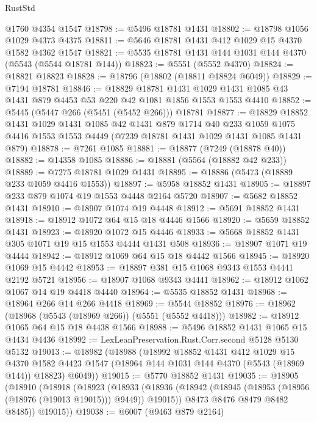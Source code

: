 \begin{lexlean}{RustStd}
\begin{coremodule}
    @1760
    @4354
    @1547
@18798 := @5496 @18781 @1431
@18802 := @18798 @1056 @1029 @4373 @4375
@18811 := @5646 @18781 @1431 @412 @1029 @15 @4370 @1582 @4362 @1547
@18821 := @5535 @18781 @1431 @144 @1031 @144 @4370 (@5543 (@5544 @18781 @144))
@18823 := @5551 (@5552 @4370)
@18824 := @18821 @18823
@18828 := @18796 (@18802 (@18811 @18824 @6049))
@18829 := @7194 @18781
@18846 := @18829
    @18781
    @1431
    @1029
    @1431
    @1085
    @43
    @1431
    @879
    @4453
    @53
    @220
    @42
    @1081
    @1856
    @1553
    @1553
    @4410
@18852 := @5445 (@5447 @266 (@5451 (@5452 @266))) @18781
@18877 := @18829
    @18852
    @1431
    @1029
    @1431
    @1085
    @42
    @1431
    @879
    @1714
    @40
    @233
    @1059
    @1075
    @4416
    @1553
    @1553
    @4449
    (@7239 @18781 @1431 @1029 @1431 @1085 @1431 @879)
@18878 := @7261 @1085
@18881 := @18877 (@7249 (@18878 @40))
@18882 := @14358 @1085
@18886 := @18881 (@5564 (@18882 @42 @233))
@18889 := @7275 @18781 @1029 @1431
@18895 := @18886 (@5473 (@18889 @233 @1059 @4416 @1553))
@18897 := @5958 @18852 @1431
@18905 := @18897 @233 @879 @1074 @19 @1553 @4448 @2164 @5720
@18907 := @5682 @18852 @1431
@18910 := @18907 @1074 @19 @4448
@18912 := @5691 @18852 @1431
@18918 := @18912 @1072 @64 @15 @18 @4446 @1566
@18920 := @5659 @18852 @1431
@18923 := @18920 @1072 @15 @4446
@18933 := @5668 @18852 @1431 @305 @1071 @19 @15 @1553 @4444 @1431 @508
@18936 := @18907 @1071 @19 @4444
@18942 := @18912 @1069 @64 @15 @18 @4442 @1566
@18945 := @18920 @1069 @15 @4442
@18953 := @18897 @381 @15 @1068 @9343 @1553 @4441 @2192 @5721
@18956 := @18907 @1068 @9343 @4441
@18962 := @18912 @1062 @1067 @14 @19 @4418 @4440
@18964 := @5535 @18852 @1431
@18968 := @18964 @266 @14 @266 @4418
@18969 := @5544 @18852
@18976 := @18962 (@18968 (@5543 (@18969 @266)) (@5551 (@5552 @4418)))
@18982 := @18912 @1065 @64 @15 @18 @4438 @1566
@18988 := @5496 @18852 @1431 @1065 @15 @4434 @4436
@18992 := LexLeanPreservation.Rust.Corr.second @5128 @5130 @5132
@19013 := @18982
    (@18988
      (@18992
        @18852
        @1431
        @412
        @1029
        @15
        @4370
        @1582
        @4423
        @1547
        (@18964 @144 @1031 @144 @4370 (@5543 (@18969 @144)) @18823)
        @6049))
@19015 := @5770 @18852 @1431
@19035 := @18905
    (@18910
      (@18918
        (@18923
          (@18933
            (@18936 (@18942 (@18945 (@18953 (@18956 (@18976 (@19013 @19015))) @9449)) @19015))
            @8473
            @8476
            @8479
            @8482
            @8485))
        @19015))
@19038 := @6007 (@9463 @879 @2164)

\end{coremodule}
\end{lexlean}
